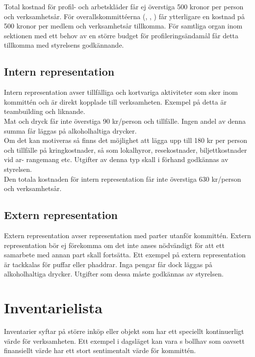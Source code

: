 \documentclass[11pt, includeaddress]{classes/cthit}
\begin{document}
Total kostnad för profil- och arbetskläder får ej överstiga 500 kronor per person och verksamhetsår. För overallskommittéerna (\NOLLKIT{}, \PRIT{}, \SEXIT{}) får ytterligare en kostnad på 500 kronor per medlem och verksamhetsår tillkomma. För samtliga organ inom sektionen med ett behov av en större budget för profileringsändamål får detta tillkomma med styrelsens godkännande.

\subsection{Intern representation}
Intern representation avser tillfälliga och kortvariga aktiviteter som sker inom kommittén och är direkt kopplade till verksamheten. Exempel på detta är teambuilding och liknande. \\

Mat och dryck får inte överstiga 90 kr/person och tillfälle. Ingen andel av denna summa får läggas på alkoholhaltiga drycker. \\

Om det kan motiveras så finns det möjlighet att lägga upp till 180 kr per person och tillfälle på kringkostnader, så som lokalhyror, resekostnader, biljettkostnader vid ar-
rangemang etc. Utgifter av denna typ skall i förhand godkännas av styrelsen. \\

Den totala kostnaden för intern representation får inte överstiga 630 kr/person och verksamhetsår.

\subsection{Extern representation}
Extern representation avser representation med parter utanför kommittén. Extern representation bör ej förekomma om det inte anses nödvändigt för att ett samarbete med annan part skall fortsätta. Ett exempel på extern representation är tackkalas för puffar eller phaddrar. Inga pengar får dock läggas på alkoholhaltiga drycker. Utgifter som dessa måste godkännas av styrelsen.


\section{Inventarielista}
Inventarier syftar på större inköp eller objekt som har ett speciellt kontinuerligt värde för verksamheten. Ett exempel i dagsläget kan vara \NOLLKIT{}s bollhav som oavsett finansiellt värde har ett stort sentimentalt värde för kommittén.
\end{document}
